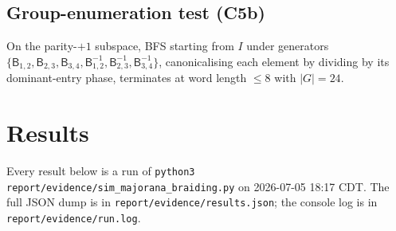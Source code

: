 \documentclass[11pt]{article}
\newcommand{\B}{\mathsf{B}}
\begin{document}
\subsection{Group-enumeration test (C5b)}
On the parity-$+1$ subspace, BFS starting from $I$ under generators $\{\B_{1,2},\B_{2,3},\B_{3,4},\B_{1,2}^{-1},\B_{2,3}^{-1},\B_{3,4}^{-1}\}$, canonicalising each element by dividing by its dominant-entry phase, terminates at word length $\le 8$ with $|G|=24$.

\section{Results}\label{sec:results}

Every result below is a run of \texttt{python3 report/evidence/sim\_majorana\_braiding.py} on 2026-07-05 18:17 CDT. The full JSON dump is in \texttt{report/evidence/results.json}; the console log is in \texttt{report/evidence/run.log}.
\end{document}
